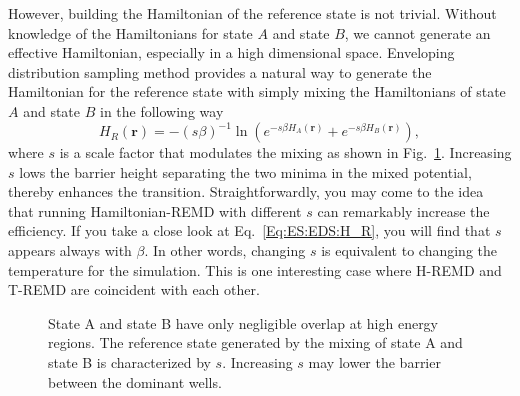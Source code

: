 However, building the Hamiltonian of the reference state is not trivial. Without knowledge of the Hamiltonians for state $A$ and state $B$, we cannot generate an effective Hamiltonian,
especially in a high dimensional space. Enveloping distribution sampling method provides a natural way to generate the Hamiltonian for the reference state with simply mixing the Hamiltonians of state $A$ and state $B$ in the following way
\begin{equation}
	H_R(\mathbf{r})=-\left(s\beta\right)^{-1}\ln{\left(e^{-s\beta H_A(\mathbf{r})}+e^{-s\beta H_B(\mathbf{r})}\right)},
	\label{Eq:ES:EDS:H_R}
\end{equation}
where $s$ is a scale factor that modulates the mixing\cite{ChristJCTC2009} as shown in Fig.~\ref{Fig:ES:EDS}. Increasing $s$ lows the barrier height separating the two minima in the mixed potential, thereby enhances the transition. Straightforwardly, you may come to the idea that running Hamiltonian-REMD with different $s$ can remarkably increase the efficiency.
If you take a close look at Eq.~\ref{Eq:ES:EDS:H_R}, you will find that $s$ appears always with $\beta$. In other words, changing $s$ is equivalent to changing the temperature for the simulation. This is one interesting case where H-REMD and T-REMD are coincident with each other. 
\begin{figure}[htbp]
	\centering
	\caption{State A and state B have only negligible overlap at high energy regions. The reference state generated by the mixing of state A and state B is characterized by $s$. Increasing $s$ may lower the barrier between the dominant wells.}\label{Fig:ES:EDS}
\end{figure}


